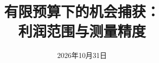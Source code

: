 \documentclass[UTF8,fontset=windows,11pt,a4paper]{ctexart}
\begin{document}
\title{有限预算下的机会捕获：\\利润范围与测量精度}
\author{}\date{2026年10月31日}
\maketitle

\clearpage\appendix
{}

\end{document}
